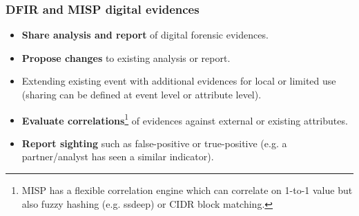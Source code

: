 \begin{frame}
\frametitle{DFIR and MISP digital evidences}
        \begin{itemize}
                \item {\bf Share analysis and report} of digital forensic evidences.
                \item {\bf Propose changes} to existing analysis or report.
                \item Extending existing event with additional evidences for local or limited use (sharing can be defined at event level or attribute level).
                \item {\bf Evaluate correlations}\footnote{MISP has a flexible correlation engine which can correlate on 1-to-1 value but also fuzzy hashing (e.g. ssdeep) or CIDR block matching.} of evidences against external or existing attributes.
                \item {\bf Report sighting} such as false-positive or true-positive (e.g. a partner/analyst has seen a similar indicator).
        \end{itemize}
\end{frame}

